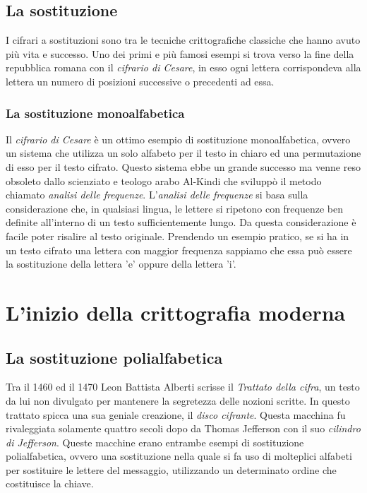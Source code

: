 \documentclass[a4paper, 12pt]{article}
\begin{document}
\subsection{La sostituzione}
I cifrari a sostituzioni sono tra le tecniche crittografiche classiche che hanno avuto più vita e successo. Uno dei primi e più famosi esempi si trova verso la fine della repubblica romana con il \textit{cifrario di Cesare}, in esso ogni lettera corrispondeva alla lettera un numero di posizioni successive o precedenti ad essa. 
\subsubsection{La sostituzione monoalfabetica}
Il \textit{cifrario di Cesare} è un ottimo esempio di sostituzione monoalfabetica, ovvero un sistema che utilizza un solo alfabeto per il testo in chiaro ed una permutazione di esso per il testo cifrato.\newline
Questo sistema ebbe un grande successo ma venne reso obsoleto dallo scienziato e teologo arabo Al-Kindi che sviluppò il metodo chiamato \textit{analisi delle frequenze}.\newline
L'\textit{analisi delle frequenze} si basa sulla considerazione che, in qualsiasi lingua, le lettere si ripetono con frequenze ben definite all'interno di un testo sufficientemente lungo. Da questa considerazione è facile poter risalire al testo originale. Prendendo un esempio pratico, se si ha in un testo cifrato una lettera con maggior frequenza sappiamo che essa può essere la sostituzione della lettera 'e' oppure della lettera 'i'.
\section{L'inizio della crittografia moderna}
\subsection{La sostituzione polialfabetica}
Tra il 1460 ed il 1470 Leon Battista Alberti scrisse il \textit{Trattato della cifra}, un testo da lui non divulgato per mantenere la segretezza delle nozioni scritte. In questo trattato spicca una sua geniale creazione, il \textit{disco cifrante}. Questa macchina fu rivaleggiata solamente quattro secoli dopo da Thomas Jefferson con il suo \textit{cilindro di Jefferson}.
Queste macchine erano entrambe esempi di sostituzione polialfabetica, ovvero una sostituzione nella quale si fa uso di molteplici alfabeti per sostituire le lettere del messaggio, utilizzando un determinato ordine che costituisce la chiave.
\end{document}
